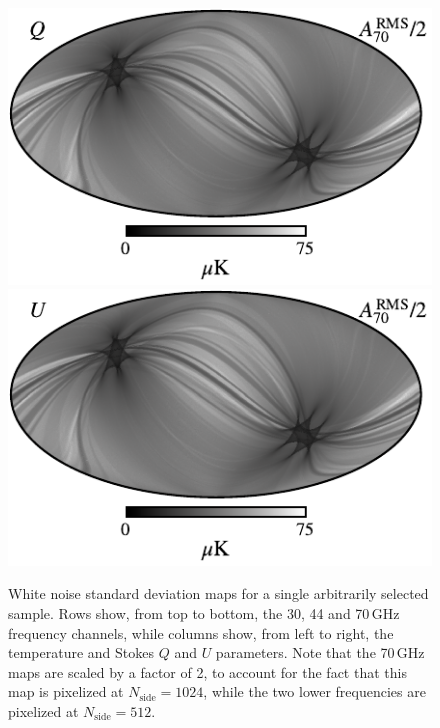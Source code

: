\documentclass[twocolumn]{aa}
\begin{document}
\begin{figure}[p]
  \includegraphics[width=0.33\linewidth]{figs/BP_070_v2_Q_RMS_w8_n1024_cb_c-neutral.pdf}
  \includegraphics[width=0.33\linewidth]{figs/BP_070_v2_U_RMS_w8_n1024_cb_c-neutral.pdf}
  \caption{White noise standard deviation maps for a single
    arbitrarily selected sample. Rows show, from top to bottom, the
    30, 44 and 70\,GHz frequency channels, while columns show, from
    left to right, the temperature and Stokes $Q$ and $U$
    parameters. Note that the 70\,GHz maps are scaled by a factor of 2,
    to account for the fact that this map is pixelized at
    $N_{\mathrm{side}}=1024$, while the two lower frequencies are
    pixelized at $N_{\mathrm{side}}=512$.}
  \label{fig:freq_rmswn}    
\end{figure}


\end{document}
